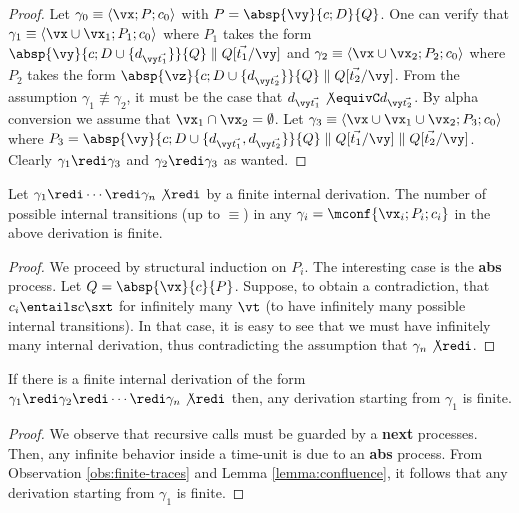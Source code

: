 \documentclass{tlp}
\begin{document}
\begin{proof}
Let  $\gamma_0\equiv \langle \vx;P; c_0 \rangle$ with $P=\absp{\vy}{c;D}{Q}$. One can verify that  $\gamma_1\equiv \langle \vx \cup \vx_1; P_1; c_0 \rangle$  where $P_1$ takes the form $\absp{\vy}{c;D\cup\{d_{\vy\vec{t_1}} \} }{Q} \parallel Q[\vec{t_1}/\vy]$ and  $\gamma_2\equiv \langle \vx \cup  \vx_2; P_2; c_0\rangle$  where $P_2$ takes the form $\absp{\vz}{c; D \cup \{d_{\vy\vec{t_2}}\}}{Q} \parallel Q[\vec{t_2}/\vy]$.  From the assumption $\gamma_1 \not\equiv \gamma_2$, it must be the case that  $d_{\vy\vec{t_1}} \not\equivC d_{\vy\vec{t_2}}$. By alpha conversion we assume that $\vx_1 \cap \vx_2 = \emptyset$. 
Let $\gamma_3 \equiv \langle \vx \cup \vx_1 \cup \vx_2; P_3; c_0\rangle$  where $P_3=\absp{\vy}{c; D \cup \{ d_{\vy\vec{t_1}},d_{\vy\vec{t_2}}\}}{Q} \parallel Q[\vec{t_1}/\vy] \parallel Q[\vec{t_2}/\vy]$.  Clearly  $\gamma_1 \redi \gamma_3$  and $\gamma_2 \redi \gamma_3$ as wanted. 
\end{proof}

\begin{observation}\label{obs:finite-traces}
Let $
\gamma_1  \redi \cdots \redi \gamma_n\not\redi
$  by a finite internal derivation. The 
number of possible internal transitions (up to $\equiv$) in any $\gamma_i = \mconf{\vx_i;P_i;c_i}$ in the above derivation is finite.
\end{observation}
\begin{proof}
We proceed  by structural induction on $P_i$. The interesting case is the {\bf abs} process. Let $Q= \absp{\vx}{c}{P}$. 
Suppose, to obtain a contradiction, that   $c_i \entails c\sxt$ for infinitely many $\vt$ (to have infinitely many possible internal transitions). In that case, it is easy to see that  we must have infinitely many internal derivation, thus contradicting the assumption that   $\gamma_n \not\redi$. 
\end{proof}

\begin{lemma}
If there is a finite internal derivation of the form $
\gamma_1 \redi \gamma_2 \redi \cdots \redi \gamma_n\not\redi
$ 
then, any derivation starting from $\gamma_1$ is finite. 
\end{lemma}
\begin{proof}
We observe that
recursive calls must be guarded by a {\bf next} processes. Then, any infinite behavior inside a time-unit is due to an {\bf abs} process. 
From  Observation \ref{obs:finite-traces} and Lemma \ref{lemma:confluence}, it follows that any derivation starting from $\gamma_1$ is finite. 
\end{proof}
\end{document}
